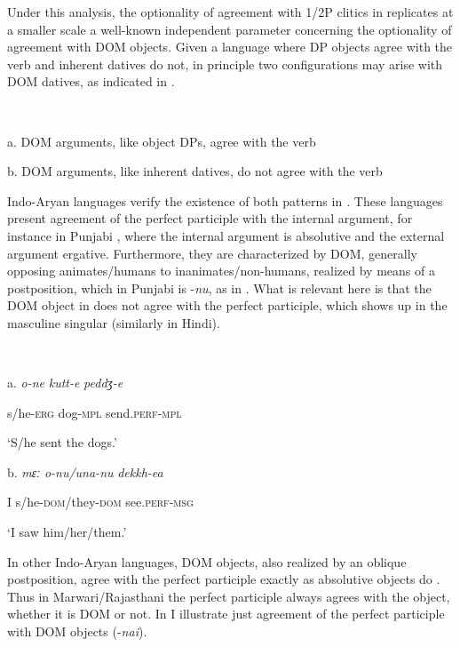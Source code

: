 \documentclass[output=paper]{langscibook}
\begin{document}
Under this analysis, the optionality of agreement with 1/2P clitics in  replicates at a smaller scale a well-known independent parameter concerning the optionality of agreement with DOM objects. Given a language where DP objects agree with the verb and inherent datives do not, in principle two configurations may arise with DOM datives, as indicated in .

\ea\label{ex:key:}
{} \\
\z

a.  DOM arguments, like object DPs, agree with the verb



b.  DOM arguments, like inherent datives, do not agree with the verb


Indo-Aryan languages verify the existence of both patterns in \emph{.} These languages present agreement of the perfect participle with the internal argument, for instance in Punjabi , where the internal argument is absolutive and the external argument ergative. Furthermore, they are characterized by DOM, generally opposing animates/humans to inanimates/non-humans, realized by means of a postposition, which in Punjabi is -\textit{nu}, as in . What is relevant here is that the DOM object in  does not agree with the perfect participle, which shows up in the masculine singular (similarly in Hindi).

\ea\label{ex:key:}
{}\\
\z

a.  \textit{o-ne}     \textit{kutt-e}     \textit{peddʒ-e}

s/he-\textsc{erg}   dog-\textsc{mpl}   send.\textsc{perf-mpl} 


‘S/he sent the dogs.’  


  b.  \textit{mɛː}   \textit{o-nu/una-nu}       \textit{dekkh-ea}

I   s/he\textsc{{}-dom}/they\textsc{{}-dom}    see.\textsc{perf-msg}

  ‘I saw him/her/them.’ 

In other Indo-Aryan languages, DOM objects, also realized by an oblique postposition, agree with the perfect participle exactly as absolutive objects do \emph{\textup{\citep[342]{Masica1991}}}. Thus in Marwari/Rajasthani the perfect participle always agrees with the object, whether it is DOM or not. In  I illustrate just agreement of the perfect participle with DOM objects (-\textit{nai}).
\end{document}
